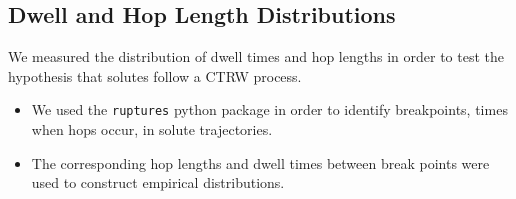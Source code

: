 \documentclass{article}
\begin{document}

  \subsection*{Dwell and Hop Length Distributions}\label{method:hops_and_dwells}

  \noindent We measured the distribution of dwell times and hop lengths in order to test
  the hypothesis that solutes follow a CTRW process.
  \begin{itemize}
	\item We used the \texttt{ruptures} python package in order to identify
	breakpoints, times when hops occur, in solute trajectories.\cite{truong_ruptures:_2018}
	\item The corresponding hop lengths and dwell times between break points were 
	used to construct empirical distributions.
  \end{itemize}
\end{document}

